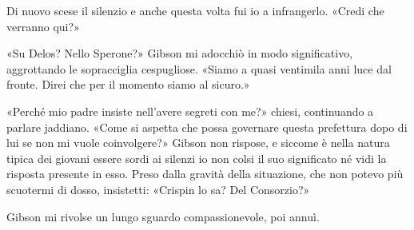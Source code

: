 Di nuovo scese il silenzio e anche questa volta fui io a infrangerlo.
«Credi che verranno qui?»

«Su Delos? Nello Sperone?» Gibson mi adocchiò in modo significativo,
aggrottando le sopracciglia cespugliose. «Siamo a quasi ventimila anni
luce dal fronte. Direi che per il momento siamo al sicuro.»

«Perché mio padre insiste nell'avere segreti con me?» chiesi,
continuando a parlare jaddiano. «Come si aspetta che possa governare
questa prefettura dopo di lui se non mi vuole coinvolgere?» Gibson non
rispose, e siccome è nella natura tipica dei giovani essere sordi ai
silenzi io non colsi il suo significato né vidi la risposta presente in
esso. Preso dalla gravità della situazione, che non potevo più scuotermi
di dosso, insistetti: «Crispin lo sa? Del Consorzio?»

Gibson mi rivolse un lungo sguardo compassionevole, poi annuì.